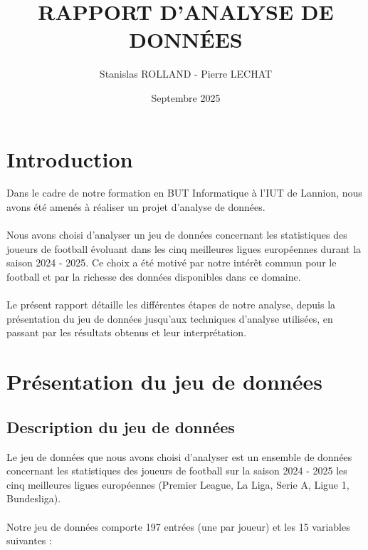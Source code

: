 \documentclass[12pt]{scrartcl}
\title{RAPPORT D'ANALYSE DE DONNÉES}
\author{Stanislas ROLLAND - Pierre LECHAT}
\date{Septembre 2025}
\begin{document}
    \maketitle
    \tableofcontents  
    \newpage
 


    \section{Introduction}

        Dans le cadre de notre formation en BUT Informatique à l'IUT de Lannion, nous avons été amenés à réaliser un projet d'analyse de données.\\\\
        Nous avons choisi d'analyser un jeu de données concernant les statistiques des joueurs de football évoluant dans les cinq meilleures ligues européennes durant la saison 2024 - 2025. Ce choix a été motivé par notre intérêt commun pour le football et par la richesse des données disponibles dans ce domaine.\\\\
        Le présent rapport détaille les différentes étapes de notre analyse, depuis la présentation du jeu de données jusqu'aux techniques d'analyse utilisées, en passant par les résultats obtenus et leur interprétation.



    \section{Présentation du jeu de données}

        \subsection{Description du jeu de données}
            Le jeu de données que nous avons choisi d'analyser est un ensemble de données concernant les statistiques des joueurs de football sur la saison 2024 - 2025 les cinq meilleures ligues européennes (Premier League, La Liga, Serie A, Ligue 1, Bundesliga).\\\\
            Notre jeu de données comporte 197 entrées (une par joueur) et les 15 variables suivantes :
\end{document}
